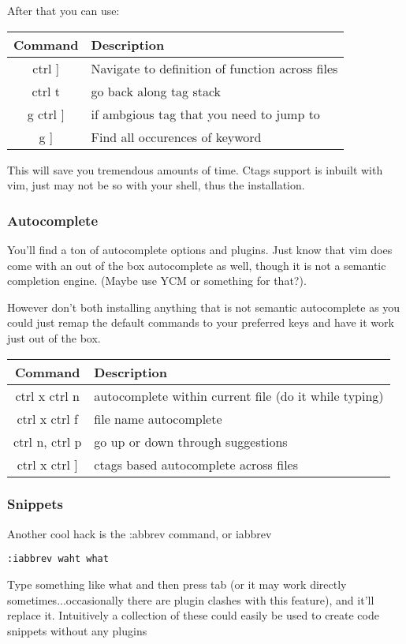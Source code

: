 \documentclass[12pt, letterpaper]{article}
\begin{document}
After that you can use:
\begin{table}[H]
    \begin{tabular}{|c|l|}
        Command & Description \\
        \hline
        ctrl ] & Navigate to definition of function across files \\
        \hline
        ctrl t & go back along tag stack \\
        \hline
        g ctrl ] & if ambgious tag that you need to jump to \\
        \hline
        g ] & Find all occurences of keyword \\
        \hline
    \end{tabular}
\end{table}

This will save you tremendous amounts of time. Ctags support is inbuilt with
vim, just may not be so with your shell, thus the installation.

\subsubsection{Autocomplete}
You'll find a ton of autocomplete options and plugins. Just know that vim does
come with an out of the box autocomplete as well, though it is not a semantic
completion engine. (Maybe use YCM or something for that?).

However don't both installing anything that is not semantic autocomplete as you
could just remap the default commands to your preferred keys and have it work
just out of the box.
\begin{table}[H]
    \begin{tabular}{|c|l|}
        Command & Description \\
        \hline
        ctrl x ctrl n & autocomplete within current file (do it while typing) \\
        \hline
        ctrl x ctrl f & file name autocomplete \\
        \hline
        ctrl n, ctrl p & go up or down through suggestions \\
        \hline
        ctrl x ctrl ] & ctags based autocomplete across files \\
        \hline
    \end{tabular}
\end{table}

\subsubsection{Snippets}
Another cool hack is the :abbrev command, or iabbrev
\begin{verbatim}
:iabbrev waht what
\end{verbatim}
Type something like what and then press tab (or it may work directly
sometimes...occasionally there are plugin clashes with this feature), and
it'll replace it.
Intuitively a collection of these could easily be used to create code
snippets without any plugins
\end{document}
